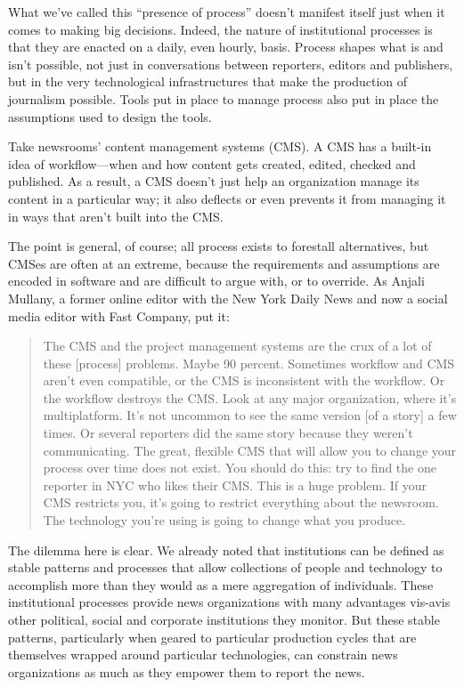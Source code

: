 What we’ve called this ``presence of process'' doesn’t manifest itself just when it
comes to making big decisions. Indeed, the nature of institutional processes is
that they are enacted on a daily, even hourly, basis. Process shapes what is and isn’t
possible, not just in conversations between reporters, editors and publishers, but
in the very technological infrastructures that make the production of journalism
possible. Tools put in place to manage process also put in place the assumptions
used to design the tools.

Take newsrooms’ content management systems (CMS). A CMS has a built-in
idea of workflow—when and how content gets created, edited, checked and
published. As a result, a CMS doesn’t just help an organization manage its content
in a particular way; it also deflects or even prevents it from managing it in ways
that aren’t built into the CMS.

The point is general, of course; all process exists to forestall alternatives, but
CMSes are often at an extreme, because the requirements and assumptions are
encoded in software and are difficult to argue with, or to override. As Anjali
Mullany, a former online editor with the New York Daily News and now a social
media editor with Fast Company, put it:

\begin{quote}The CMS and the project management systems are the crux of a lot
of these [process] problems. Maybe 90 percent. Sometimes workflow
and CMS aren’t even compatible, or the CMS is inconsistent with the
workflow. Or the workflow destroys the CMS. Look at any major organization,
where it’s multiplatform. It’s not uncommon to see the same
version [of a story] a few times. Or several reporters did the same story
because they weren’t communicating. The great, flexible CMS that will
allow you to change your process over time does not exist. You should
do this: try to find the one reporter in NYC who likes their CMS. This
is a huge problem. If your CMS restricts you, it’s going to restrict everything
about the newsroom. The technology you’re using is going to
change what you produce.
\end{quote}

The dilemma here is clear. We already noted that institutions can be defined as
stable patterns and processes that allow collections of people and technology to
accomplish more than they would as a mere aggregation of individuals. These
institutional processes provide news organizations with many advantages vis-avis
other political, social and corporate institutions they monitor. But these stable
patterns, particularly when geared to particular production cycles that are themselves
wrapped around particular technologies, can constrain news organizations
as much as they empower them to report the news.

